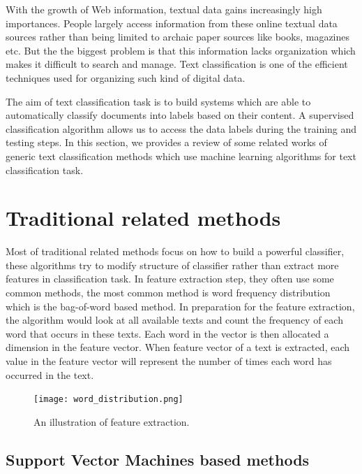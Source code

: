 \documentclass[senior]{IPSstyle}
\begin{document}
With the growth of Web information, textual data gains increasingly high importances.  People largely  access  information  from  these  online textual data sources rather than being limited to archaic paper sources like books, magazines etc. But  the  the biggest  problem  is  that  this  information  lacks  organization  which  makes  it difficult  to  search and manage.  Text  classification  is  one  of  the  efficient techniques  used  for organizing such kind of digital data.  

The  aim  of  text  classification task  is to  build  systems  which are able  to automatically
classify  documents  into labels based  on  their  content. A supervised classification algorithm allows us to access the data labels during the training and testing steps. In this section, we provides a review of some related works of generic text classification methods which use machine learning algorithms for text classification task.


\section{Traditional related methods}

Most of traditional related methods focus on how to build a powerful classifier, these algorithms try to modify structure of classifier rather than extract more features in classification task. In feature extraction step, they often use some common methods, the most common method is word frequency distribution which is the bag-of-word based method. In preparation for the feature extraction, the algorithm would look at all available texts and count the frequency of each word that occurs in these texts. Each word in the vector is then allocated a dimension in the feature vector.  When feature vector of a text is extracted, each value in the feature vector will represent the number of times each word has occurred in the text.

\begin{figure}[t]
  \centering
  \texttt{[image: word\_distribution.png]}\\
  \caption{An illustration of feature extraction.}\label{NBde}
\end{figure}

\subsection{Support Vector Machines based methods}
\end{document}
